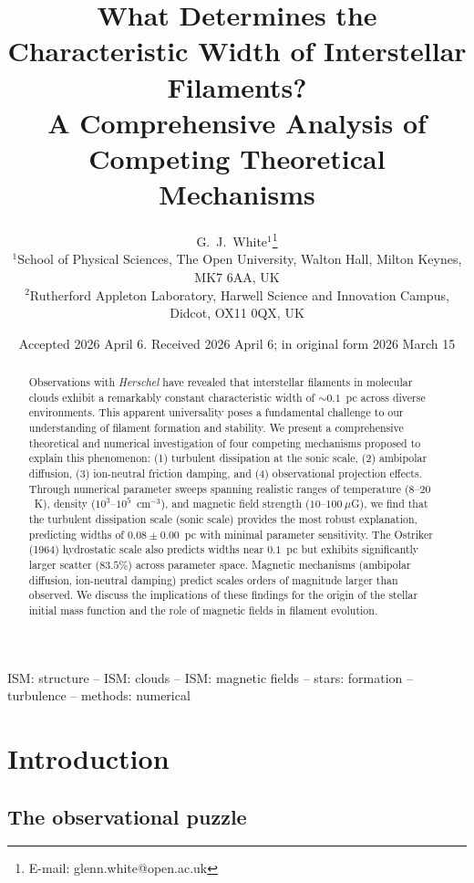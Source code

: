 \documentclass{mnras}
\title[What Determines Interstellar Filament Widths?]{What Determines the Characteristic Width of Interstellar Filaments?\\
A Comprehensive Analysis of Competing Theoretical Mechanisms}
\author[G.~J.~White et al.]{G.~J.~White$^{1}$\thanks{E-mail: glenn.white@open.ac.uk}
\\
$^{1}$School of Physical Sciences, The Open University, Walton Hall, Milton Keynes, MK7 6AA, UK\\
$^{2}$Rutherford Appleton Laboratory, Harwell Science and Innovation Campus, Didcot, OX11 0QX, UK
}
\date{Accepted 2026 April 6. Received 2026 April 6; in original form 2026 March 15}
\begin{document}
\maketitle

\begin{abstract}
Observations with \textit{Herschel} have revealed that interstellar filaments in molecular clouds exhibit a remarkably constant characteristic width of $\sim0.1$~pc across diverse environments. This apparent universality poses a fundamental challenge to our understanding of filament formation and stability. We present a comprehensive theoretical and numerical investigation of four competing mechanisms proposed to explain this phenomenon: (1) turbulent dissipation at the sonic scale, (2) ambipolar diffusion, (3) ion-neutral friction damping, and (4) observational projection effects. Through numerical parameter sweeps spanning realistic ranges of temperature ($8$--$20$~K), density ($10^3$--$10^5$~cm$^{-3}$), and magnetic field strength ($10$--$100~\mu$G), we find that the turbulent dissipation scale (sonic scale) provides the most robust explanation, predicting widths of $0.08\pm0.00$~pc with minimal parameter sensitivity. The Ostriker (1964) hydrostatic scale also predicts widths near $0.1$~pc but exhibits significantly larger scatter ($83.5$\%) across parameter space. Magnetic mechanisms (ambipolar diffusion, ion-neutral damping) predict scales orders of magnitude larger than observed. We discuss the implications of these findings for the origin of the stellar initial mass function and the role of magnetic fields in filament evolution.
\end{abstract}

\begin{keywords}
ISM: structure -- ISM: clouds -- ISM: magnetic fields -- stars: formation -- turbulence -- methods: numerical
\end{keywords}


\section{Introduction}

\subsection{The observational puzzle}
\end{document}
